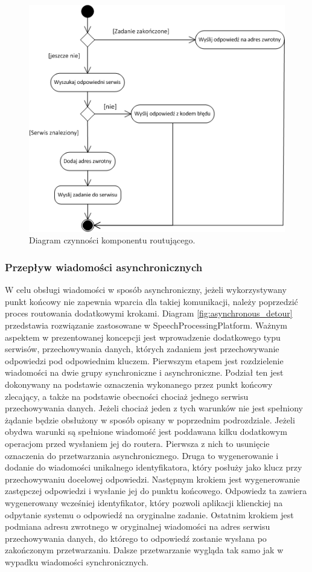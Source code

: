 \begin{figure}[!h]
	\centering
	\includegraphics[scale=0.75]{router_activity.png}
	\caption{Diagram czynności komponentu routującego. }\label{fig:router_activity_diagram}
\end{figure}

\subsubsection*{Przepływ wiadomości asynchronicznych}
W celu obsługi wiadomości w sposób asynchroniczny, jeżeli wykorzystywany punkt końcowy nie zapewnia wparcia dla takiej komunikacji, należy poprzedzić proces routowania dodatkowymi krokami.
Diagram \ref{fig:asynchronous_detour} przedstawia rozwiązanie zastosowane w SpeechProcessingPlatform. Ważnym aspektem w prezentowanej koncepcji jest wprowadzenie dodatkowego typu serwisów, przechowywania danych, których zadaniem jest przechowywanie odpowiedzi pod odpowiednim kluczem. Pierwszym etapem jest rozdzielenie wiadomości na dwie grupy synchroniczne i asynchroniczne. Podział ten jest dokonywany na podstawie oznaczenia wykonanego przez punkt końcowy zlecający, a także na podstawie obecności chociaż jednego serwisu przechowywania danych. Jeżeli chociaż jeden z tych warunków nie jest spełniony żądanie będzie obsłużony w sposób opisany w poprzednim podrozdziale. Jeżeli obydwa warunki są spełnione wiadomość jest poddawana kilku dodatkowym operacjom przed wysłaniem jej do routera. Pierwsza z nich to usunięcie oznaczenia do przetwarzania asynchronicznego. Druga to wygenerowanie i dodanie do wiadomości unikalnego identyfikatora, który posłuży jako klucz przy przechowywaniu docelowej odpowiedzi. Następnym krokiem jest wygenerowanie zastępczej odpowiedzi i wysłanie jej do punktu końcowego. Odpowiedz ta zawiera wygenerowany wcześniej identyfikator, który pozwoli aplikacji klienckiej na odpytanie systemu o odpowiedź na oryginalne zadanie. Ostatnim krokiem jest podmiana adresu zwrotnego w oryginalnej wiadomości na adres serwisu przechowywania danych, do którego to odpowiedź zostanie wysłana po zakończonym przetwarzaniu.  Dalsze przetwarzanie wygląda tak samo jak w wypadku wiadomości synchronicznych.


